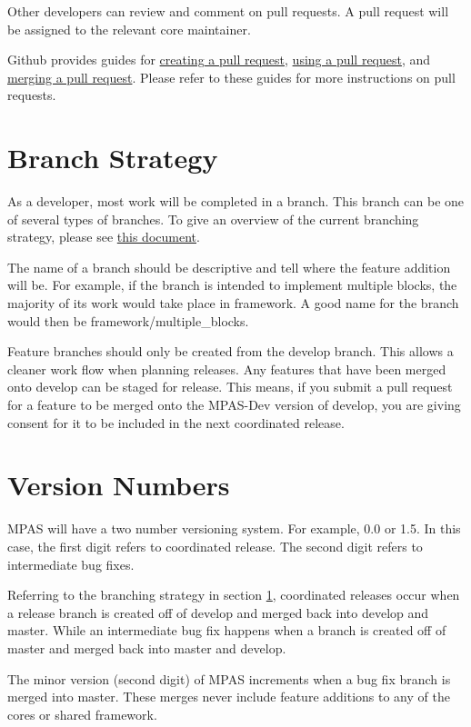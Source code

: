\documentclass[11pt]{report}
\begin{document}
Other developers can review and comment on pull requests. A pull request will
be assigned to the relevant core maintainer.

Github provides guides for
\href{https://help.github.com/articles/creating-a-pull-request}{creating a pull
request}, \href{https://help.github.com/articles/using-pull-requests}{using a
pull request}, and
\href{https://help.github.com/articles/merging-a-pull-request}{merging a pull
request}. Please refer
to these guides for more instructions on pull requests.

\section{Branch Strategy}
\label{sec:branches}
As a developer, most work will be completed in a branch. This branch can be one
of several types of branches. To give an overview of the current branching
strategy, please see
\href{http://nvie.com/posts/a-successful-git-branching-model/}{this document}. 

The name of a branch should be descriptive and tell where the feature addition
will be. For example, if the branch is intended to implement multiple blocks,
the majority of its work would take place in framework. A good name for the
branch would then be framework/multiple\_blocks.

Feature branches should only be created from the develop branch. This allows a
cleaner work flow when planning releases. Any features that have been merged
onto develop can be staged for release. This means, if you submit a pull
request for a feature to be merged onto the MPAS-Dev version of develop, you
are giving consent for it to be included in the next coordinated release.

\section{Version Numbers}
\label{sec:version-numbers}
MPAS will have a two number versioning system. For example, 0.0 or 1.5. In this
case, the first digit refers to coordinated release. The second digit refers to
intermediate bug fixes.

Referring to the branching strategy in section \ref{sec:branches}, coordinated
releases occur when a release branch is created off of develop and merged back
into develop and master. While an intermediate bug fix happens when a branch is
created off of master and merged back into master and develop.

The minor version (second digit) of MPAS increments when a bug fix branch is
merged into master. These merges never include feature additions to any of the
cores or shared framework.
\end{document}
